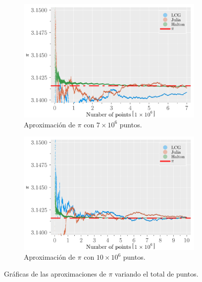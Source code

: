 \begin{enumerate}
\begin{solution}
\begin{figure}
\begin{subfigure}{0.45\textwidth}
                \centering
                \includegraphics[scale=0.065]{../figures/pies_7E6.png}
                \caption{Aproximación de $\pi$ con $7 \times 10^6$ puntos.}
                \label{fig:pi_approx_7e6}
            \end{subfigure}
            \hfill
            \begin{subfigure}{0.45\textwidth}
                \centering
                \includegraphics[scale=0.065]{../figures/pies_10E6.png}
                \caption{Aproximación de $\pi$ con $10 \times 10^6$ puntos.}
                \label{fig:pi_approx_10e6}
            \end{subfigure}
            \caption{Gráficas de las aproximaciones de $\pi$ variando el total de puntos.}
            \label{fig:pi_approximations}
        \end{figure}


\end{solution}
\end{enumerate}
